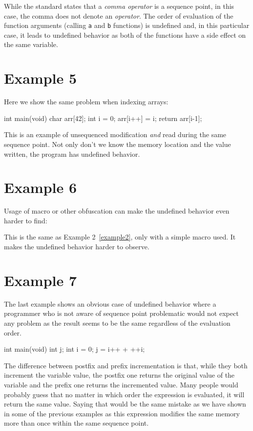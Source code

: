 While the standard states that a \emph{comma operator} is a sequence point, in this case, the comma does not denote an \emph{operator}. The order of evaluation of the function arguments (calling \verb|a| and \verb|b| functions) is undefined and, in this particular case, it leads to undefined behavior as both of the functions have a side effect on the same variable.

\section{Example 5}\label{example5}
Here we show the same problem when indexing arrays:
\\\begin{code}
int main(void){
    char arr[42];
    int i = 0;
    arr[i++] = i;
    return arr[i-1];
}
\end{code}

This is an example of unsequenced modification \emph{and} read during the same sequence point. Not only don't we know the memory location and the value written, the program has undefined behavior.

\section{Example 6}\label{example6}
Usage of macro or other obfuscation can make the undefined behavior even harder to find:
\\\begin{code}
#define MACRO i = (*j)++;
int main(){
  int i = 0;
  int *j = &i;
  MACRO
  return i;
}
}
\end{code}

This is the same as Example 2~\ref{example2}, only with a simple macro used. It makes the undefined behavior harder to observe.

\section{Example 7}\label{example7}
The last example shows an obvious case of undefined behavior where a programmer who is not aware of sequence point problematic would not expect any problem as the result seems to be the same regardless of the evaluation order.
\\\begin{code}
int main(void){
    int j;
    int i = 0;
    j = i++ + ++i;
}
\end{code}

The difference between postfix and prefix incrementation is that, while they both increment the variable value, the postfix one returns the original value of the variable and the prefix one returns the incremented value. Many people would probably guess that no matter in which order the expression is evaluated, it will return the same value. Saying that would be the same mistake as we have shown in some of the previous examples as this expression modifies the same memory more than once within the same sequence point.


